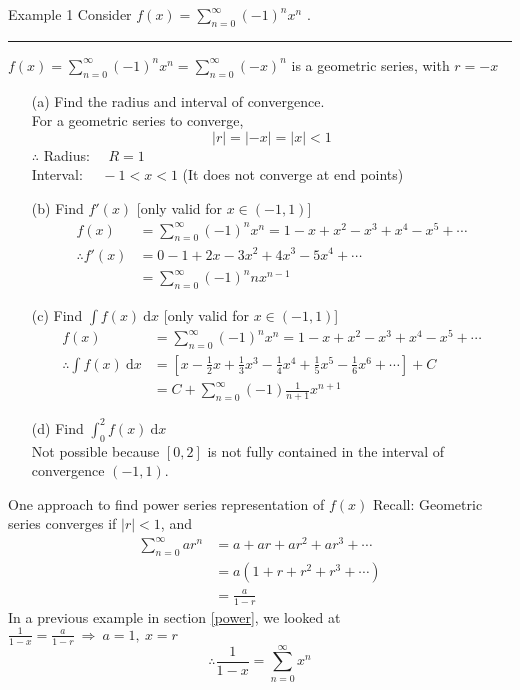 \documentclass[12pt,a4paper]{article}
\def\d{{\mathrm{d}}}
\def\dx{\d x}
\begin{document}
\begin{eg}{Example 1}
	Consider $\displaystyle f(x)=\sum^\infty_{n=0}(-1)^nx^n$	.\\
	\noindent\rule[0.25\baselineskip]{\textwidth}{1pt}
	$\displaystyle f(x)=\sum^\infty_{n=0}(-1)^nx^n=\sum^\infty_{n=0}(-x)^n$ is a geometric series, with $r=-x$
	\begin{enumerate}
		\item[(a)] Find the radius and interval of convergence. \\
		For a geometric series to converge, $$|r|=|-x|=|x|<1$$
		$\therefore$ Radius: $\quad R=1$\\
		Interval: $\quad -1<x<1$ (It does not converge at end points)
		\item[(b)] Find $f'(x)$ [only valid for $x\in(-1,1)$]
		$$\begin{aligned}
			f(x)&=\sum^\infty_{n=0}(-1)^nx^n=1-x+x^2-x^3+x^4-x^5+\cdots\\
			\therefore f'(x)&=0-1+2x-3x^2+4x^3-5x^4+\cdots\\
			&=\sum^\infty_{n=0}(-1)^nnx^{n-1}
		\end{aligned}$$
		\item[(c)] Find $\displaystyle\int f(x)\ \dx$ [only valid for $x\in(-1,1)$]
		$$\begin{aligned}
			f(x)&=\sum^\infty_{n=0}(-1)^nx^n=1-x+x^2-x^3+x^4-x^5+\cdots\\
			\therefore\int f(x)\ \dx &=\left[x-\frac{1}{2}x+\frac{1}{3}x^3-\frac{1}{4}x^4+\frac{1}{5}x^5-\frac{1}{6}x^6+\cdots\right]+C\\
			&=C+\sum^\infty_{n=0}(-1)\frac{1}{n+1}x^{n+1}
		\end{aligned}$$
		\item[(d)] Find $\displaystyle\int_0^2f(x)\ \dx$\\
		Not possible because $[0, 2]$ is not fully contained in the interval of convergence $(-1,1).$
	\end{enumerate}
\end{eg}
\begin{thm}{One approach to find power series representation of $f(x)$}
	Recall: Geometric series converges if $|r|<1$, and 
	$$\begin{aligned}
		\sum^\infty_{n=0}ar^n&=a+ar+ar^2+ar^3+\cdots\\
		&=a(1+r+r^2+r^3+\cdots)\\
		&=\frac{a}{1-r}
	\end{aligned}$$
	In a previous example in section \ref{power}, we looked at $\displaystyle\frac{1}{1-x}=\frac{a}{1-r}\ \Rightarrow\ a=1,\ x=r$\\
	$$\therefore\frac{1}{1-x}=\sum^\infty_{n=0}x^n$$
\end{thm}
\end{document}
